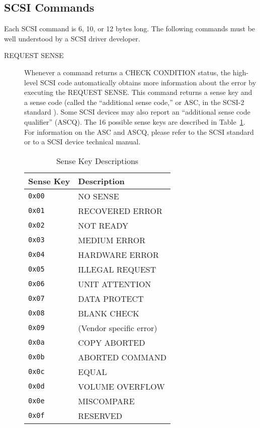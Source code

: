 \subsection{SCSI Commands}
\label{sec:scsi.commands}

Each SCSI command is 6, 10, or 12 bytes long.  The following commands must
be well understood by a SCSI driver developer.
\begin{description}
\item[REQUEST SENSE] Whenever a command returns a CHECK CONDITION status,
  the high-level \Linux{} SCSI code automatically obtains more information
  about the error by executing the REQUEST SENSE\@.  This command returns a
  sense key and a sense code (called the ``additional sense code,'' or ASC,
  in the SCSI-2 standard \cite{scsi2.standard}).  Some SCSI devices may
  also report an ``additional sense code qualifier'' (ASCQ)\@.  The 16
  possible sense keys are described in Table~\ref{tab:sense.keys}.  For
  information on the ASC and ASCQ, please refer to the SCSI standard
  \cite{scsi2.standard} or to a SCSI device technical manual.

  \begin{table}[hbtp]
    \leavevmode
    \begin{center}
      \begin{tabular}{|l|l|}\hline
        Sense Key & Description \\\hline\hline
        {\tt 0x00} & NO SENSE \\\hline
        {\tt 0x01} & RECOVERED ERROR \\\hline
        {\tt 0x02} & NOT READY \\\hline
        {\tt 0x03} & MEDIUM ERROR \\\hline
        {\tt 0x04} & HARDWARE ERROR \\\hline
        {\tt 0x05} & ILLEGAL REQUEST \\\hline
        {\tt 0x06} & UNIT ATTENTION \\\hline
        {\tt 0x07} & DATA PROTECT \\\hline
        {\tt 0x08} & BLANK CHECK \\\hline
        {\tt 0x09} & (Vendor specific error) \\\hline
        {\tt 0x0a} & COPY ABORTED \\\hline
        {\tt 0x0b} & ABORTED COMMAND \\\hline
        {\tt 0x0c} & EQUAL \\\hline
        {\tt 0x0d} & VOLUME OVERFLOW \\\hline
        {\tt 0x0e} & MISCOMPARE \\\hline
        {\tt 0x0f} & RESERVED \\\hline
      \end{tabular}
      \caption{Sense Key Descriptions}
      \label{tab:sense.keys}
    \end{center}
  \end{table}
  

\end{description}
